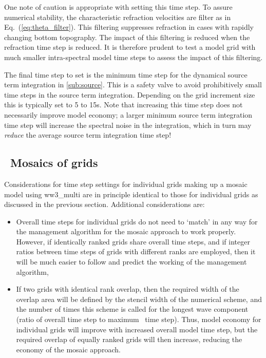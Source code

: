One note of caution is appropriate with setting this time step. To assure
numerical stability, the characteristic refraction velocities are filter as in
Eq.~(\ref{eq:theta_filter}). This filtering suppresses refraction in cases
with rapidly changing bottom topography. The impact of this filtering is
reduced when the refraction time step is reduced. It is therefore prudent to
test a model grid with much smaller intra-spectral model time steps to assess
the impact of this filtering.

The final time step to set is the minimum time step for the dynamical source
term integration in \para\ref{sub:source}. This is a safety valve to avoid
prohibitively small time steps in the source term integration. Depending on
the grid increment size this is typically set to 5 to 15s. Note that
increasing this time step does not necessarily improve model economy; a larger
minimum source term integration time step will increase the spectral noise in
the integration, which in turn may {\em reduce} the average source term
integration time step!


\subsection{~Mosaics of grids}

Considerations for time step settings for individual grids making up a mosaic
model using {\file ww3\_multi} are in principle identical to those for
individual grids as discussed in the previous section. Additional
considerations are:

\begin{itemize}

\item Overall time steps for individual grids do not need to `match' in any
way for the management algorithm for the mosaic approach to work properly.
However, if identically ranked grids share overall time steps, and if integer
ratios between time steps of grids with different ranks are employed, then it
will be much easier to follow and predict the working of the management
algorithm,

\item If two grids with identical rank overlap, then the required width of the
overlap area will be defined by the stencil width of the numerical scheme, and
the number of times this scheme is called for the longest wave component
(ratio of overall time step to maximum \cfl\ time step). Thus, model economy
for individual grids will improve with increased overall model time step, but
the required overlap of equally ranked grids will then increase, reducing the
economy of the mosaic approach.

\end{itemize}

\bpage \pagestyle{empty}
